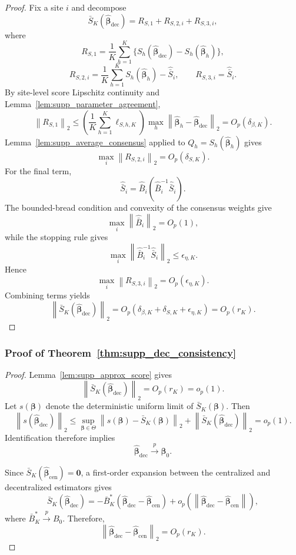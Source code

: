 \documentclass[12pt]{article}
\theoremstyle{remark}
\numberwithin{equation}{section}
\newcommand{\bbeta}{\boldsymbol{\beta}}
\newcommand{\bzero}{\mathbf 0}
\newcommand{\norm}[1]{\left\lVert#1\right\rVert}
\begin{document}
\begin{proof}
Fix a site \(i\) and decompose
\[
\bar S_K(\widehat{\bbeta}_{\mathrm{dec}})
=
R_{S,1}+R_{S,2,i}+R_{S,3,i},
\]
where
\[
R_{S,1}
=
\frac1K\sum_{h=1}^K
\{S_h(\widehat{\bbeta}_{\mathrm{dec}})-S_h(\widehat{\bbeta}_h)\},
\]
\[
R_{S,2,i}
=
\frac1K\sum_{h=1}^KS_h(\widehat{\bbeta}_h)
-
\widehat{\bar S}_i,
\qquad
R_{S,3,i}=\widehat{\bar S}_i.
\]
By site-level score Lipschitz continuity and
Lemma~\ref{lem:supp_parameter_agreement},
\[
\norm{R_{S,1}}_2
\le
\left(\frac1K\sum_{h=1}^K\ell_{S,h,K}\right)
\max_h
\norm{\widehat{\bbeta}_h-\widehat{\bbeta}_{\mathrm{dec}}}_2
=
O_p(\delta_{\beta,K}).
\]
Lemma~\ref{lem:supp_average_consensus} applied to
\(Q_h=S_h(\widehat{\bbeta}_h)\) gives
\[
\max_i\norm{R_{S,2,i}}_2
=
O_p(\delta_{S,K}).
\]
For the final term,
\[
\widehat{\bar S}_i
=
\widehat{\bar B}_i
(\widehat{\bar B}_i^{-1}\widehat{\bar S}_i).
\]
The bounded-bread condition and convexity of the consensus weights give
\[
\max_i\norm{\widehat{\bar B}_i}_2=O_p(1),
\]
while the stopping rule gives
\[
\max_i
\norm{\widehat{\bar B}_i^{-1}\widehat{\bar S}_i}_2
\le
\epsilon_{\eta,K}.
\]
Hence
\[
\max_i\norm{R_{S,3,i}}_2
=
O_p(\epsilon_{\eta,K}).
\]
Combining terms yields
\[
\norm{\bar S_K(\widehat{\bbeta}_{\mathrm{dec}})}_2
=
O_p(\delta_{\beta,K}+\delta_{S,K}+\epsilon_{\eta,K})
=
O_p(r_K).
\]
\end{proof}

\subsubsection{Proof of Theorem~\ref{thm:supp_dec_consistency}}

\begin{proof}
Lemma~\ref{lem:supp_approx_score} gives
\[
\norm{\bar S_K(\widehat{\bbeta}_{\mathrm{dec}})}_2
=
O_p(r_K)
=
o_p(1).
\]
Let \(s(\bbeta)\) denote the deterministic uniform limit of
\(\bar S_K(\bbeta)\). Then
\[
\norm{s(\widehat{\bbeta}_{\mathrm{dec}})}_2
\le
\sup_{\bbeta\in\Theta}
\norm{s(\bbeta)-\bar S_K(\bbeta)}_2
+
\norm{\bar S_K(\widehat{\bbeta}_{\mathrm{dec}})}_2
=
o_p(1).
\]
Identification therefore implies
\[
\widehat{\bbeta}_{\mathrm{dec}}
\xrightarrow{p}
\bbeta_0.
\]

Since \(\bar S_K(\widehat{\bbeta}_{\mathrm{cen}})=\bzero\), a first-order
expansion between the centralized and decentralized estimators gives
\[
\bar S_K(\widehat{\bbeta}_{\mathrm{dec}})
=
-\bar B_K^*
(\widehat{\bbeta}_{\mathrm{dec}}-\widehat{\bbeta}_{\mathrm{cen}})
+
o_p\left(
\norm{\widehat{\bbeta}_{\mathrm{dec}}-\widehat{\bbeta}_{\mathrm{cen}}}
\right),
\]
where \(\bar B_K^*\xrightarrow{p}B_0\). Therefore,
\[
\norm{
\widehat{\bbeta}_{\mathrm{dec}}
-
\widehat{\bbeta}_{\mathrm{cen}}
}_2
=
O_p(r_K).
\]
\end{proof}
\end{document}
